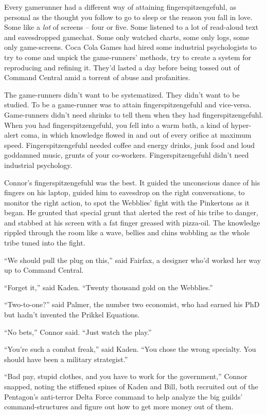 Every gamerunner had a different way of attaining
fingerspitzengefuhl, as personal as the thought you follow to go to
sleep or the reason you fall in love. Some like a \emph{lot} of
screens -- four or five. Some listened to a lot of read-aloud text
and eavesdropped gamechat. Some only watched charts, some only
logs, some only game-screens. Coca Cola Games had hired some
industrial psychologists to try to come and unpick the
game-runners' methods, try to create a system for reproducing and
refining it. They'd lasted a day before being tossed out of Command
Central amid a torrent of abuse and profanities.

The game-runners didn't want to be systematized. They didn't want
to be studied. To be a game-runner was to attain
fingerspitzengefuhl and vice-versa. Game-runners didn't need
shrinks to tell them when they had fingerspitzengefuhl. When you
had fingerspitzengefuhl, you fell into a warm bath, a kind of
hyper-alert coma, in which knowledge flowed in and out of every
orifice at maximum speed. Fingerspitzengefuhl needed coffee and
energy drinks, junk food and loud goddamned music, grunts of your
co-workers. Fingerspitzengefuhl didn't need industrial psychology.

Connor's fingerspitzengefuhl was the best. It guided the
unconscious dance of his fingers on his laptop, guided him to
eavesdrop on the right conversations, to monitor the right action,
to spot the Webblies' fight with the Pinkertons as it began. He
grunted that special grunt that alerted the rest of his tribe to
danger, and stabbed at his screen with a fat finger greased with
pizza-oil. The knowledge rippled through the room like a wave,
bellies and chins wobbling as the whole tribe tuned into the
fight.

``We should pull the plug on this,'' said Fairfax, a designer who'd
worked her way up to Command Central.

``Forget it,'' said Kaden. ``Twenty thousand gold on the Webblies.''

``Two-to-one?'' said Palmer, the number two economist, who had earned
his PhD but hadn't invented the Prikkel Equations.

``No bets,'' Connor said. ``Just watch the play.''

``You're such a combat freak,'' said Kaden. ``You chose the wrong
specialty. You should have been a military strategist.''

``Bad pay, stupid clothes, and you have to work for the government,''
Connor snapped, noting the stiffened spines of Kaden and Bill, both
recruited out of the Pentagon's anti-terror Delta Force command to
help analyze the big guilds' command-structures and figure out how
to get more money out of them.

